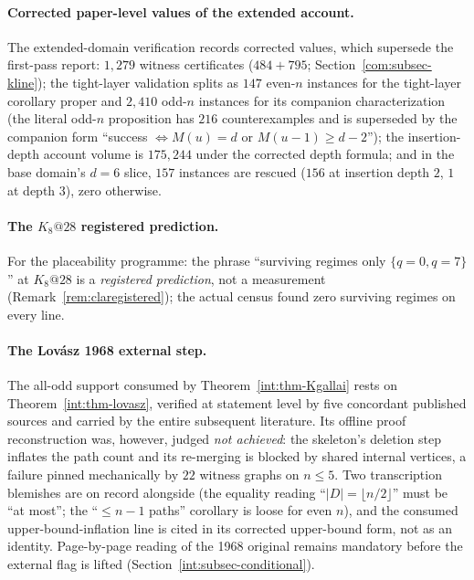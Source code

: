 \paragraph{Corrected paper-level values of the extended account.} The
extended-domain verification records corrected values, which supersede the
first-pass report: $1{,}279$ witness certificates ($484+795$; Section~\ref{com:subsec-kline}); the tight-layer validation
splits as $147$ even-$n$ instances for the tight-layer corollary proper
and $2{,}410$ odd-$n$ instances for its companion characterization
(the literal odd-$n$ proposition has $216$ counterexamples and is
superseded by the companion form ``success $\iff M(u)=d$ or
$M(u-1)\ge d-2$''); the insertion-depth account volume is $175{,}244$
under the corrected depth formula; and in the base domain's $d=6$
slice, $157$ instances are rescued ($156$ at insertion depth $2$, $1$
at depth $3$), zero otherwise.

\paragraph{The $K_8@28$ registered prediction.} For the placeability
programme: the phrase ``surviving regimes only $\{q=0,q=7\}$'' at
$K_8@28$ is a \emph{registered prediction}, not a measurement
(Remark~\ref{rem:claregistered}); the actual census found zero surviving
regimes on every line.

\paragraph{The Lov\'asz 1968 external step.} The all-odd support consumed
by Theorem~\ref{int:thm-Kgallai} rests on Theorem~\ref{int:thm-lovasz},
verified at statement level by five concordant published sources and
carried by the entire subsequent literature. Its offline proof
reconstruction was, however, judged \emph{not achieved}: the skeleton's
deletion step inflates the path count and its re-merging is blocked by
shared internal vertices, a failure pinned mechanically by $22$ witness
graphs on $n\le5$. Two transcription blemishes are on record alongside
(the equality reading ``$|D|=\lfloor n/2\rfloor$'' must be ``at
most''; the ``$\le n-1$ paths'' corollary is loose for even $n$), and
the consumed upper-bound-inflation line is cited in its corrected
upper-bound form, not as an identity. Page-by-page reading of the 1968
original remains mandatory before the external flag is lifted
(Section~\ref{int:subsec-conditional}).


